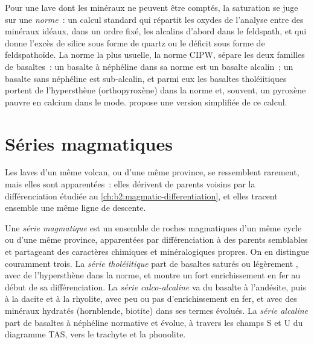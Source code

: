Pour une lave dont les minéraux ne peuvent être comptés, la saturation se juge sur une
\emph{norme}~: un calcul standard qui répartit les oxydes de l'analyse entre des minéraux idéaux,
dans un ordre fixé, les alcalins d'abord dans le feldspath, et qui donne l'excès de silice
sous forme de quartz ou le déficit sous forme de feldspathoïde. La norme la plus usuelle, la norme CIPW, sépare
les deux familles de basaltes~: un basalte à néphéline dans sa norme est un basalte alcalin~;
un basalte sans néphéline est sub-alcalin, et parmi eux les basaltes tholéiitiques portent de
l'hypersthène (orthopyroxène) dans la norme et, souvent, un pyroxène pauvre en calcium dans le mode.
 propose une version simplifiée de ce calcul.

\section{Séries magmatiques}\label{sec:b2:magmatic-series:series}

Les laves d'un même volcan, ou d'une même province, se ressemblent rarement, mais elles sont apparentées~: elles
dérivent de  parents voisins par la différenciation étudiée au
\cref{ch:b2:magmatic-differentiation}, et elles tracent ensemble une même ligne de descente.

\begin{definition}\label{def:b2:magmatic-series:series}
Une \emph{série magmatique} est un ensemble de roches magmatiques d'un même cycle
ou d'une même province, apparentées par différenciation à des  parents semblables et partageant des
caractères chimiques et minéralogiques propres. On en distingue couramment trois. La
\emph{série tholéiitique} part de basaltes saturés ou légèrement
, avec de l'hypersthène dans la norme, et montre un fort enrichissement en fer
au début de sa différenciation. La \emph{série calco-alcaline} va du
basalte à l'andésite, puis à la dacite et à la rhyolite, avec peu ou pas d'enrichissement en fer, et
avec des minéraux hydratés (hornblende, biotite) dans ses termes évolués. La
\emph{série alcaline} part de basaltes à néphéline normative et évolue, à travers
les champs S et U du diagramme TAS,
vers le trachyte et la phonolite.
\end{definition}

